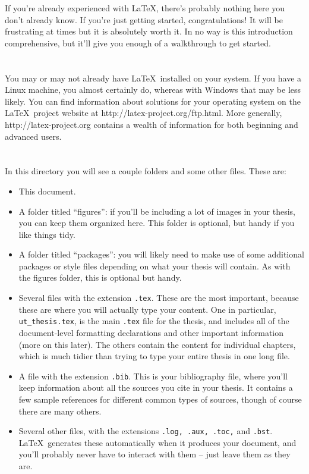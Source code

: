 If you're already experienced with \LaTeX, there's probably
nothing here you don't
already know. If you're just getting started, congratulations! It will be
frustrating at times but it is absolutely worth it. In no way is this 
introduction comprehensive,  but it'll give you enough
of a walkthrough to get started.

\section{}
You may or may not already have \LaTeX ~installed on your system. If you have
a Linux machine, you almost certainly do, whereas with Windows that may be 
less likely. You can find information about solutions for your operating system
on the \LaTeX ~project website at http://latex-project.org/ftp.html.
More generally, http://latex-project.org contains a wealth of 
information for both beginning and advanced users.

\section{}
In this directory you will see a couple folders and some other files. These are:

\begin{itemize}
  \item This document.
  \item A folder titled ``figures'': if you'll be including a lot of images
    in your thesis, you can keep them organized here. This folder is optional,
    but handy if you like things tidy.
  \item A folder titled ``packages'': you will likely need to make use of 
    some additional packages or style files depending on what your thesis
    will contain. As with the figures folder, this is optional but handy.
  \item Several files with the extension {\tt .tex}. These are the most 
    important, because these are where you will actually type your content.
    One in particular, {\tt ut\_thesis.tex}, is the main {\tt .tex} file for the
    thesis, and includes all of the document-level formatting declarations and
    other important information (more on this later). The others contain the
    content for individual chapters, which is much tidier than trying
    to type your entire thesis in one long file.
  \item A file with the extension {\tt .bib}. This is your bibliography file,
    where you'll keep information about all the sources you cite in your thesis.
    It contains a few sample references for different common types of sources,
    though of course there are many others.
  \item Several other files, with the extensions {\tt .log, .aux, .toc,} and 
    {\tt .bst}. \LaTeX ~generates these automatically when it
    produces your document, and you'll probably never have to interact with
    them -- just leave them as they are.
\end{itemize}

